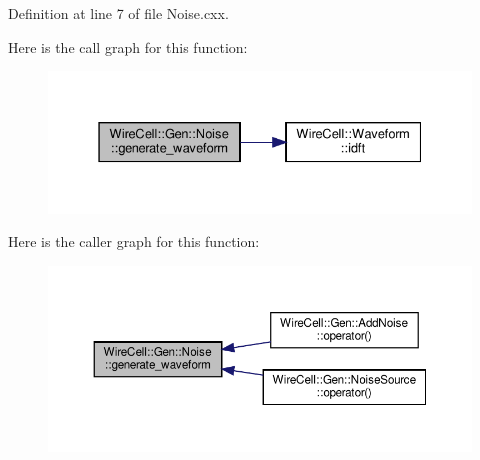 Definition at line 7 of file Noise.\+cxx.

Here is the call graph for this function\+:
\nopagebreak
\begin{figure}[H]
\begin{center}
\leavevmode
\includegraphics[width=331pt]{namespace_wire_cell_1_1_gen_1_1_noise_ad7ec0edc1ec5b6bd4ab3525d091eedba_cgraph}
\end{center}
\end{figure}
Here is the caller graph for this function\+:
\nopagebreak
\begin{figure}[H]
\begin{center}
\leavevmode
\includegraphics[width=350pt]{namespace_wire_cell_1_1_gen_1_1_noise_ad7ec0edc1ec5b6bd4ab3525d091eedba_icgraph}
\end{center}
\end{figure}
